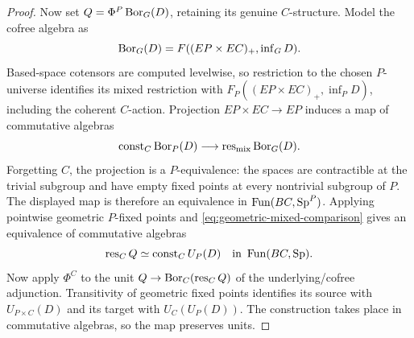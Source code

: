 \begin{proof}
Now set \(Q=\Phi^P\operatorname{Bor}_G(D)\), retaining its genuine
\(C\)-structure. Model the cofree algebra as
\[
 \operatorname{Bor}_G(D)=F((EP\times EC)_+,\operatorname{inf}_G D).
\]
Based-space cotensors are computed levelwise, so restriction to the
chosen \(P\)-universe identifies its mixed restriction with
\(F_P((EP\times EC)_+,\operatorname{inf}_P D)\), including the
coherent \(C\)-action. Projection \(EP\times EC\to EP\) induces
a map of commutative algebras
\[
 \operatorname{const}_C\operatorname{Bor}_P(D)
 \longrightarrow\operatorname{res}_{\mathrm{mix}}\operatorname{Bor}_G(D).
\]
Forgetting \(C\), the projection is a \(P\)-equivalence: the spaces
are contractible at the trivial subgroup and have empty fixed points
at every nontrivial subgroup of \(P\). The displayed map is therefore
an equivalence in \(\operatorname{Fun}(BC,\mathrm{Sp}^P)\). Applying pointwise geometric
\(P\)-fixed points and \eqref{eq:geometric-mixed-comparison} gives
an equivalence of commutative algebras
\[
 \operatorname{res}_C Q\simeq\operatorname{const}_C U_P(D)
       \quad\text{in }\operatorname{Fun}(BC,\mathrm{Sp}).
\]
Now apply \(\Phi^C\) to the unit
\(Q\to\operatorname{Bor}_C(\operatorname{res}_C Q)\) of the underlying/cofree
adjunction.  Transitivity of geometric fixed points identifies its
source with \(U_{P\times C}(D)\) and its target with
\(U_C(U_P(D))\).  The construction takes place in commutative
algebras, so the map preserves units.
\end{proof}

